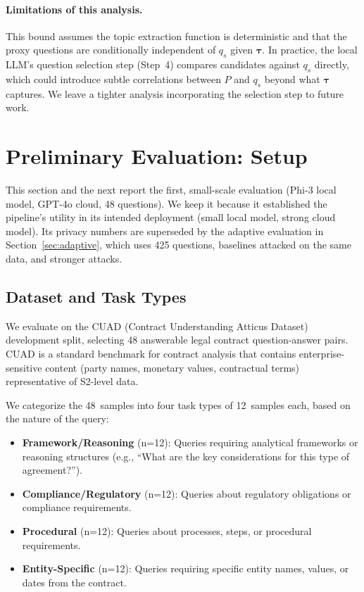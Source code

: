 \documentclass[sigconf,balance=false]{acmart}
\begin{document}
\paragraph{Limitations of this analysis.} This bound assumes the topic extraction function is deterministic and that the proxy questions are conditionally independent of $q_s$ given $\boldsymbol{\tau}$. In practice, the local LLM's question selection step (Step~4) compares candidates against $q_s$ directly, which could introduce subtle correlations between $P$ and $q_s$ beyond what $\boldsymbol{\tau}$ captures. We leave a tighter analysis incorporating the selection step to future work.

\section{Preliminary Evaluation: Setup}
\label{sec:setup}

This section and the next report the first, small-scale evaluation (Phi-3 local model, GPT-4o cloud, 48 questions). We keep it because it established the pipeline's utility in its intended deployment (small local model, strong cloud model). Its privacy numbers are superseded by the adaptive evaluation in Section~\ref{sec:adaptive}, which uses 425 questions, baselines attacked on the same data, and stronger attacks.

\subsection{Dataset and Task Types}
\label{sec:dataset}

We evaluate on the CUAD (Contract Understanding Atticus Dataset) development split, selecting 48 answerable legal contract question-answer pairs. CUAD is a standard benchmark for contract analysis that contains enterprise-sensitive content (party names, monetary values, contractual terms) representative of S2-level data.

We categorize the 48~samples into four task types of 12~samples each, based on the nature of the query:

\begin{itemize}
\item \textbf{Framework/Reasoning} (n=12): Queries requiring analytical frameworks or reasoning structures (e.g., ``What are the key considerations for this type of agreement?'').
\item \textbf{Compliance/Regulatory} (n=12): Queries about regulatory obligations or compliance requirements.
\item \textbf{Procedural} (n=12): Queries about processes, steps, or procedural requirements.
\item \textbf{Entity-Specific} (n=12): Queries requiring specific entity names, values, or dates from the contract.
\end{itemize}
\end{document}
